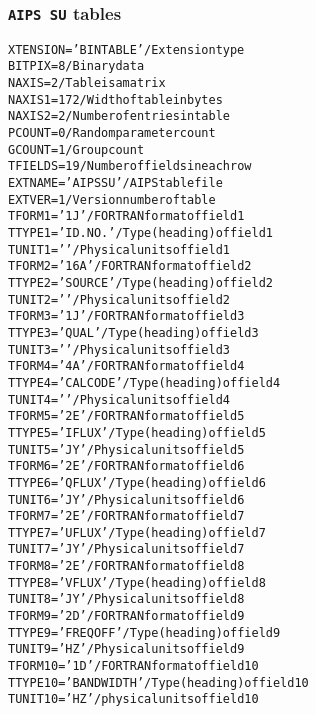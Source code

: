 \documentclass[twoside]{article}
\begin{document}
\subsubsection{{\tt AIPS SU} tables}
\label{Appe:SUtable}
\begin{alltt}
XTENSION= 'BINTABLE'           / Extension type
BITPIX  =                    8 / Binary data
NAXIS   =                    2 / Table is a matrix
NAXIS1  =                  172 / Width of table in bytes
NAXIS2  =                    2 / Number of entries in table
PCOUNT  =                    0 / Random parameter count
GCOUNT  =                    1 / Group count
TFIELDS =                   19 / Number of fields in each row
EXTNAME = 'AIPS SU '           / AIPS table file
EXTVER  =                    1 / Version number of table
TFORM1  = '1J      '           / FORTRAN format of field  1
TTYPE1  = 'ID. NO.         '   / Type (heading) of field  1
TUNIT1  = '        '           / Physical units of field  1
TFORM2  = '16A     '           / FORTRAN format of field  2
TTYPE2  = 'SOURCE          '   / Type (heading) of field  2
TUNIT2  = '        '           / Physical units of field  2
TFORM3  = '1J      '           / FORTRAN format of field  3
TTYPE3  = 'QUAL            '   / Type (heading) of field  3
TUNIT3  = '        '           / Physical units of field  3
TFORM4  = '4A      '           / FORTRAN format of field  4
TTYPE4  = 'CALCODE         '   / Type (heading) of field  4
TUNIT4  = '        '           / Physical units of field  4
TFORM5  = '2E      '           / FORTRAN format of field  5
TTYPE5  = 'IFLUX           '   / Type (heading) of field  5
TUNIT5  = 'JY      '           / Physical units of field  5
TFORM6  = '2E      '           / FORTRAN format of field  6
TTYPE6  = 'QFLUX           '   / Type (heading) of field  6
TUNIT6  = 'JY      '           / Physical units of field  6
TFORM7  = '2E      '           / FORTRAN format of field  7
TTYPE7  = 'UFLUX           '   / Type (heading) of field  7
TUNIT7  = 'JY      '           / Physical units of field  7
TFORM8  = '2E      '           / FORTRAN format of field  8
TTYPE8  = 'VFLUX           '   / Type (heading) of field  8
TUNIT8  = 'JY      '           / Physical units of field  8
TFORM9  = '2D      '           / FORTRAN format of field  9
TTYPE9  = 'FREQOFF         '   / Type (heading) of field  9
TUNIT9  = 'HZ      '           / Physical units of field  9
TFORM10 = '1D      '           / FORTRAN format of field 10
TTYPE10 = 'BANDWIDTH       '   / Type (heading) of field 10
TUNIT10 = 'HZ      '           / physical units of field 10

\end{alltt}
\end{document}
